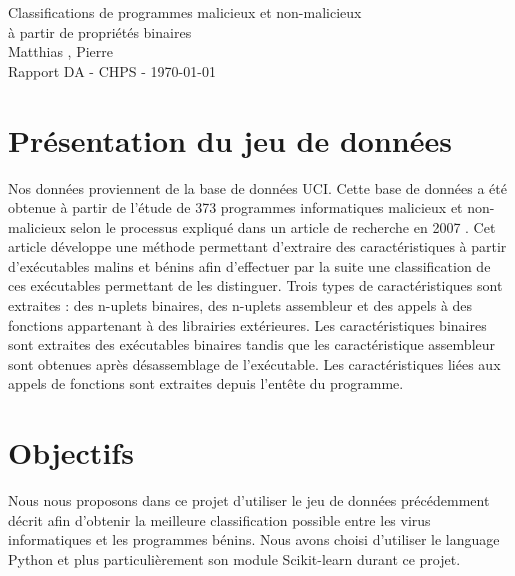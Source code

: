 \documentclass[11pt,a4paper]{article}
\begin{document}
\begin{center}

	{\LARGE\centering Classifications de programmes malicieux et non-malicieux\\ à partir de propriétés binaires}\\[1cm]

	{ Matthias , Pierre }\\[0.5cm]
	{Rapport DA - CHPS - \today}
\end{center}

\tableofcontents

\section{Présentation du jeu de données}
	Nos données proviennent de la base de données UCI\cite{UCI}.
	Cette base de données a été obtenue à partir de l'étude de 373 programmes informatiques malicieux et non-malicieux selon le processus expliqué dans un article de recherche en 2007 \cite{article}. Cet article développe une méthode permettant d'extraire des caractéristiques à partir d'exécutables malins et bénins afin d'effectuer par la suite une classification de ces exécutables permettant de les distinguer. Trois types de caractéristiques sont extraites : des n-uplets binaires, des n-uplets assembleur et des appels à des fonctions appartenant à des librairies extérieures. Les caractéristiques binaires sont extraites des exécutables binaires tandis que les caractéristique assembleur sont obtenues après désassemblage de l'exécutable. Les caractéristiques liées aux appels de fonctions sont extraites depuis l'entête du programme.

\section{Objectifs}
	Nous nous proposons dans ce projet d'utiliser le jeu de données précédemment décrit afin d'obtenir la meilleure classification possible entre les virus informatiques et les programmes bénins. Nous avons choisi d'utiliser le language Python et plus particulièrement son module Scikit-learn \cite{sklearn} durant ce projet.
\end{document}
